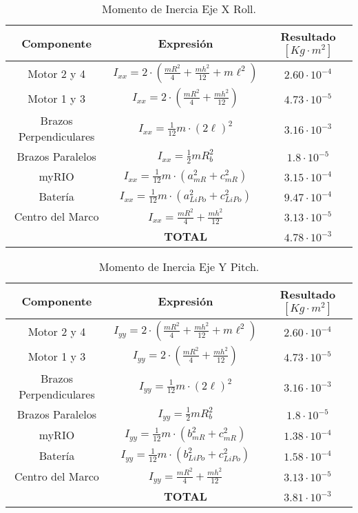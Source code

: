 \documentclass[\main/main.tex]{subfiles}
\begin{document}
\textcompwordmark{}

\begin{table}[H]
\noindent \begin{centering}
\begin{tabular}{|c|c|c|}
\hline 
\textbf{Componente } & \textbf{Expresión} & \textbf{Resultado $[Kg\cdot m^2]$}\tabularnewline
\hline 
\hline 
Motor 2 y 4 & $I_{xx}=2\cdot(\frac{mR^{2}}{4}+\frac{mh^{2}}{12}+m\ell^{2})$ & $2.60\cdot10^{-4}$\tabularnewline
\hline 
Motor 1 y 3 & $I_{xx}=2\cdot(\frac{mR^{2}}{4}+\frac{mh^{2}}{12})$ & $4.73\cdot10^{-5}$\tabularnewline
\hline 
Brazos Perpendiculares & $I_{xx}=\frac{1}{12}m\cdot(2\ell)^{2}$ & $3.16\cdot10^{-3}$\tabularnewline
\hline 
Brazos Paralelos & $I_{xx}=\frac{1}{2}mR_{b}^{2}$ & $1.8\cdot10^{-5}$\tabularnewline
\hline 
myRIO & $I_{xx}=\frac{1}{12}m\cdot(a_{mR}^{2}+c_{mR}^{2})$ & $3.15\cdot10^{-4}$\tabularnewline
\hline 
Batería & $I_{xx}=\frac{1}{12}m\cdot(a_{LiPo}^{2}+c_{LiPo}^{2})$ & $9.47\cdot10^{-4}$\tabularnewline
\hline 
Centro del Marco & $I_{xx}=\frac{mR^{2}}{4}+\frac{mh^{2}}{12}$ & $3.13\cdot10^{-5}$\tabularnewline
\hline 
\multicolumn{1}{c|}{} & \textbf{TOTAL} & $4.78\cdot10^{-3}$\tabularnewline
\cline{2-3} 
\end{tabular}
\par\end{centering}
\caption{Momento de Inercia Eje X Roll.}
\end{table}

\begin{table}[H]
\noindent \begin{centering}
\begin{tabular}{|c|c|c|}
\hline 
\textbf{Componente } & \textbf{Expresión} & \textbf{Resultado $[Kg\cdot m^2]$}\tabularnewline
\hline 
\hline 
Motor 2 y 4 & $I_{yy}=2\cdot(\frac{mR^{2}}{4}+\frac{mh^{2}}{12}+m\ell^{2})$ & $2.60\cdot10^{-4}$\tabularnewline
\hline 
Motor 1 y 3 & $I_{yy}=2\cdot(\frac{mR^{2}}{4}+\frac{mh^{2}}{12})$ & $4.73\cdot10^{-5}$\tabularnewline
\hline 
Brazos Perpendiculares & $I_{yy}=\frac{1}{12}m\cdot(2\ell)^{2}$ & $3.16\cdot10^{-3}$\tabularnewline
\hline 
Brazos Paralelos & $I_{yy}=\frac{1}{2}mR_{b}^{2}$ & $1.8\cdot10^{-5}$\tabularnewline
\hline 
myRIO & $I_{yy}=\frac{1}{12}m\cdot(b_{mR}^{2}+c_{mR}^{2})$ & $1.38\cdot10^{-4}$\tabularnewline
\hline 
Batería & $I_{yy}=\frac{1}{12}m\cdot(b_{LiPo}^{2}+c_{LiPo}^{2})$ & $1.58\cdot10^{-4}$\tabularnewline
\hline 
Centro del Marco & $I_{yy}=\frac{mR^{2}}{4}+\frac{mh^{2}}{12}$ & $3.13\cdot10^{-5}$\tabularnewline
\hline 
\multicolumn{1}{c|}{} & \textbf{TOTAL} & $3.81\cdot10^{-3}$\tabularnewline
\cline{2-3} 
\end{tabular}
\par\end{centering}
\caption{Momento de Inercia Eje Y Pitch.}
\end{table}
\end{document}
